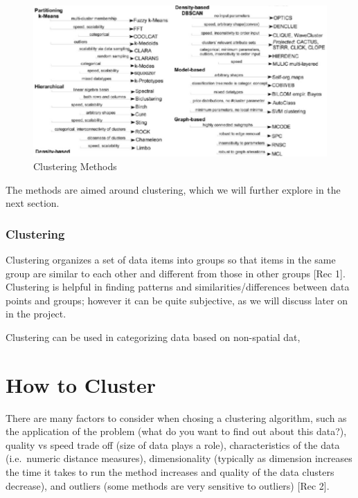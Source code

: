 \documentclass[12pt,twoside]{amherstthesis}
\begin{document}
  \begin{figure}[htbp]
  \centering
  \includegraphics[scale = 0.5,angle = 0]{clustering_methods.png}
  \caption[Clustering Methods]{\normalsize{Clustering Methods}}
  \label{fig:Clustering}
  \end{figure}
  
  The methods are aimed around clustering, which we will further explore
  in the next section.
  
  \subsection{Clustering}\label{clustering}
  
  Clustering organizes a set of data items into groups so that items in
  the same group are similar to each other and different from those in
  other groups {[}Rec 1{]}. Clustering is helpful in finding patterns and
  similarities/differences between data points and groups; however it can
  be quite subjective, as we will discuss later on in the project.
  
  Clustering can be used in categorizing data based on non-spatial dat,
  
  \chapter{How to Cluster}\label{rmd-basics}
  
  There are many factors to consider when chosing a clustering algorithm,
  such as the application of the problem (what do you want to find out
  about this data?), quality vs speed trade off (size of data plays a
  role), characteristics of the data (i.e.~numeric distance measures),
  dimensionality (typically as dimension increases the time it takes to
  run the method increases and quality of the data clusters decrease), and
  outliers (some methods are very sensitive to outliers) {[}Rec 2{]}.
  
\end{document}
